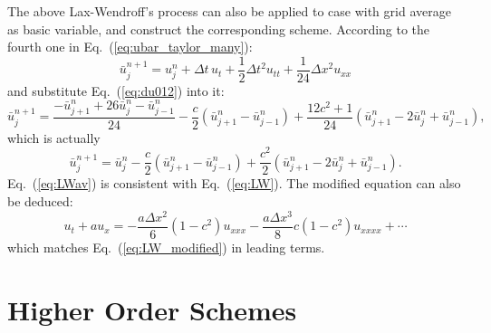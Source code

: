 \documentclass[]{article}
\begin{document}

The above Lax-Wendroff's process can also be applied to case with grid
average as basic variable, and construct the corresponding scheme.
According to the fourth one in Eq.~(\ref{eq:ubar_taylor_many}):
\[
\bar u_{j}^{n+1}  = u_j^n+\Delta t\, u_t + \frac{1}{2}\Delta t^2
u_{tt} + \frac{1}{24} \Delta x^2 u_{xx}
\]
and substitute Eq.~(\ref{eq:du012}) into it:
\[
\bar u_j^{n+1}  = \frac{-\bar u_{j+1}^n + 26\bar u_j^n - \bar u_{j-1}^n}{24}-
\frac{c}{2}\left(\bar u_{j+1}^n-\bar u_{j-1}^n\right) +
\frac{12c^2+1}{24}\left(\bar u_{j+1}^n-2\bar u_j^n+\bar
u_{j-1}^n\right),
\]
which is actually
\begin{equation}
  \bar u_j^{n+1} = \bar u_j^n -\frac{c}{2}\left(\bar u_{j+1}^n-\bar u_{j-1}^n\right) +
  \frac{c^2}{2}\left(\bar u_{j+1}^n-2\bar u_j^n+\bar u_{j-1}^n\right).
  \label{eq:LWav}
\end{equation}
Eq.~(\ref{eq:LWav}) is consistent with Eq.~(\ref{eq:LW}). The
modified equation can also be deduced:
\begin{equation*}
  u_t+au_x=-\frac{a\Delta x^2}{6}(1-c^2)u_{xxx} -\frac{a\Delta x^3}{8}c(1-c^2)u_{xxxx}+\cdots
\end{equation*}
which matches Eq.~(\ref{eq:LW_modified}) in leading terms.




\section{Higher Order Schemes}\label{sec:higher-order-schemes}
\end{document}
